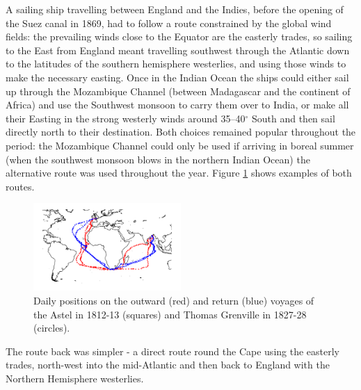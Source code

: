 \documentclass[CP]{copernicus}
\begin{document}
A sailing ship travelling between England and the Indies, before the opening of the Suez canal in 1869, had to follow a route constrained by the global wind fields: the prevailing winds close to the Equator are the easterly trades, so sailing to the East from England meant travelling southwest through the Atlantic down to the latitudes of the southern hemisphere westerlies, and using those winds to make the necessary easting. Once in the Indian Ocean the ships could either sail up through the Mozambique Channel (between Madagascar and the continent of Africa) and use the Southwest monsoon to carry them over to India, or make all their Easting in the strong westerly winds around 35--40$^\circ$ South and then sail directly north to their destination. Both choices remained popular throughout the period: the Mozambique Channel could only be used if arriving in boreal summer (when the southwest monsoon blows in the northern Indian Ocean) the alternative route was used throughout the year. Figure \ref{Fsroc2} shows examples of both routes.
\begin{figure}[!hbp]
\begin{center}
\includegraphics[angle=0, width=0.5\textwidth]{../figures/TG+A_routes.pdf}
\caption{Daily positions on the outward (red) and return (blue) voyages of the Astel in 1812-13 (squares) and Thomas Grenville in 1827-28 (circles).}
\label{Fsroc2}
\end{center}
\end{figure}
The route back was simpler - a direct route round the Cape using the easterly trades, north-west into the mid-Atlantic and then back to England with the Northern Hemisphere westerlies.
\end{document}

